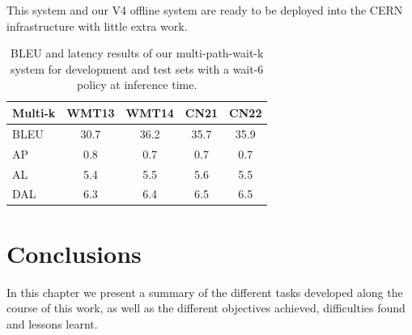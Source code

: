 \documentclass[11pt,english,listoffigures,listoftables]{tfgetsinf}
\begin{document}
This system and our V4 offline system are ready to be deployed into the CERN infrastructure with little extra work. 



\begin{table}
\caption{BLEU and latency results of our multi-path-wait-k system for development and test sets with a wait-6 policy at inference time.}
\centering
\begin{tabular}{l|c|c|c|c}
    Multi-k & WMT13 & WMT14 & CN21 & CN22 \\
\hline
    BLEU & 30.7 & 36.2 & 35.7 & 35.9 \\
    \hline
    AP & 0.8 & 0.7 & 0.7 & 0.7 \\
    AL & 5.4 & 5.5 & 5.6 & 5.5 \\
    DAL & 6.3 & 6.4 & 6.5 & 6.5 \\
\end{tabular}
\label{table:testres}
\end{table}












\chapter{Conclusions}\label{conclusion}

In this chapter we present a summary of the different tasks developed along the course of this work, as well as the different objectives achieved, difficulties found and lessons learnt. 
\end{document}

